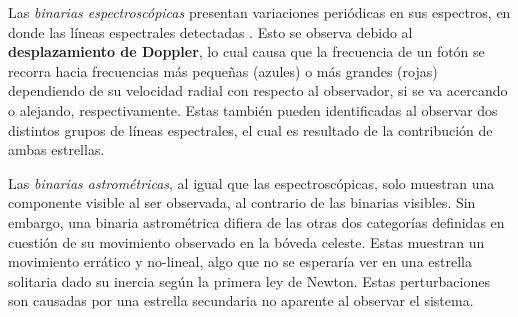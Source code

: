 Las \textit{binarias espectroscópicas} presentan variaciones periódicas en sus
espectros, en donde las líneas espectrales detectadas 
\citet{astronomyPhysicalPerspective::chapter5_binaryStars}. Esto se observa
debido al \textbf{desplazamiento de Doppler}, lo cual causa que la frecuencia de
un fotón se recorra hacia frecuencias más pequeñas (azules) o más grandes
(rojas) dependiendo de su velocidad radial con respecto al observador, si se va
acercando o alejando, respectivamente. Estas también pueden identificadas al
observar dos distintos grupos de líneas espectrales, el cual es resultado de la
contribución de ambas estrellas.

Las \textit{binarias astrométricas}, al igual que las espectroscópicas, solo
muestran una componente visible al ser observada, al contrario de las binarias
visibles. Sin embargo, una binaria astrométrica difiera de las otras dos
categorías definidas en cuestión de su movimiento observado en la bóveda
celeste. Estas muestran un movimiento errático y no-lineal, algo que no se
esperaría ver en una estrella solitaria dado su inercia según la primera ley de
Newton. Estas perturbaciones son causadas por una estrella secundaria no
aparente al observar el sistema. 